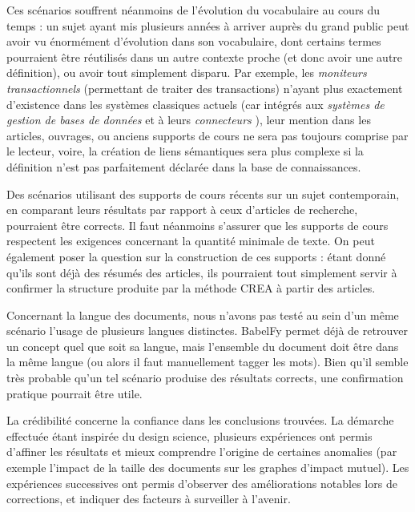 Ces scénarios souffrent néanmoins de l'évolution du vocabulaire au cours du temps : un sujet ayant mis plusieurs années à arriver auprès du grand public peut avoir vu énormément d'évolution dans son vocabulaire, dont certains termes pourraient être réutilisés dans un autre contexte proche (et donc avoir une autre définition), ou avoir tout simplement disparu.
Par exemple, les \og \textit{moniteurs transactionnels} \fg (permettant de traiter des transactions) n'ayant plus exactement d'existence dans les systèmes classiques actuels (car intégrés aux \og \textit{systèmes de gestion de bases de données} \fg et à leurs \og \textit{connecteurs} \fg), leur mention dans les articles, ouvrages, ou anciens supports de cours ne sera pas toujours comprise par le lecteur, voire, la création de liens sémantiques sera plus complexe si la définition n'est pas parfaitement déclarée dans la base de connaissances.

Des scénarios utilisant des supports de cours récents sur un sujet contemporain, en comparant leurs résultats par rapport à ceux d'articles de recherche, pourraient être corrects.
Il faut néanmoins s'assurer que les supports de cours respectent les exigences concernant la quantité minimale de texte.
On peut également poser la question sur la construction de ces supports : étant donné qu'ils sont déjà des résumés des articles, ils pourraient tout simplement servir à confirmer la structure produite par la méthode CREA à partir des articles.

Concernant la langue des documents, nous n'avons pas testé au sein d'un même scénario l'usage de plusieurs langues distinctes.
BabelFy permet déjà de retrouver un concept quel que soit sa langue, mais l'ensemble du document doit être dans la même langue (ou alors il faut manuellement tagger les mots).
Bien qu'il semble très probable qu'un tel scénario produise des résultats corrects, une confirmation pratique pourrait être utile.

\bigskip

La crédibilité concerne la confiance dans les conclusions trouvées.
La démarche effectuée étant inspirée du design science, plusieurs expériences ont permis d'affiner les résultats et mieux comprendre l'origine de certaines anomalies (par exemple l'impact de la taille des documents sur les graphes d'impact mutuel).
Les expériences successives ont permis d'observer des améliorations notables lors de corrections, et indiquer des facteurs à surveiller à l'avenir.

\bigskip


